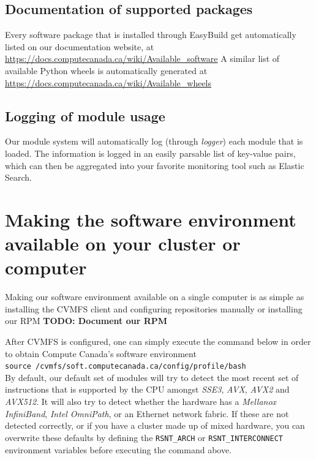 \documentclass[sigconf]{acmart}
\begin{document}
\subsection{Documentation of supported packages}
\label{sub:Documentation}
Every software package that is installed through EasyBuild get automatically listed on our documentation website, at \\
\url{https://docs.computecanada.ca/wiki/Available_software}
A similar list of available Python wheels is automatically generated at \\
\url{https://docs.computecanada.ca/wiki/Available_wheels}


\subsection{Logging of module usage}
\label{sub:Logging}
Our module system will automatically log (through {\it logger}) each module that is loaded. The information is logged in an easily parsable list of key-value pairs, which can then be aggregated into your favorite monitoring tool such as Elastic Search. 

\section{Making the software environment available on your cluster or computer}
\label{sec:Making_it_available}
Making our software environment available on a single computer is as simple as installing the CVMFS client and configuring repositories manually or installing our RPM
\textbf{TODO: Document our RPM}

After CVMFS is configured, one can simply execute the command below in order to obtain Compute Canada's software environment \\
\texttt{source /cvmfs/soft.computecanada.ca/config/profile/bash} \\

By default, our default set of modules will try to detect the most recent set of instructions that is supported by the CPU amongst {\it SSE3}, {\it AVX}, {\it AVX2} and {\it AVX512}. It will also try to detect whether the hardware has a {\it Mellanox InfiniBand}, {\it Intel OmniPath}, or an Ethernet network fabric. If these are not detected correctly, or if you have a cluster made up of mixed hardware, you can overwrite these defaults by defining the {\verb!RSNT_ARCH!} or {\verb!RSNT_INTERCONNECT!} environment variables before executing the command above. 
\end{document}
